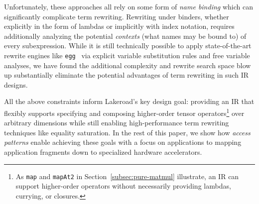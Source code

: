 \documentclass[prologue, dvipsnames, sigplan, screen, review, anonymous]{acmart}
\newcommand{\g}{Lakeroad\xspace}
\newcommand{\tcd}[1]{\texttt{#1}}
\newcommand{\mcd}[1]{\mathrm{\tcd{#1}}}
\begin{document}
Unfortunately, these approaches all rely on some
  form of \textit{name binding} which can
  significantly complicate term rewriting.
Rewriting under binders,
  whether explicitly in the form of lambdas
  or implicitly with index notation,
  requires additionally analyzing the
  potential \textit{contexts}
  (what names may be bound to)
  of every subexpression.
While it is still technically possible to
  apply state-of-the-art rewrite engines
  like \tcd{egg}~\cite{willsey2021egg}
  via explicit variable substitution rules and
  free variable analyses,
  we have found the additional complexity
  and rewrite search space blow up
  substantially eliminate the potential advantages
  of term rewriting in such IR designs.

All the above constraints inform \g's key design goal:
  providing an IR that flexibly supports specifying and
  composing higher-order tensor operators\footnote{
    As \tcd{map} and \tcd{mapAt2} in 
    Section~\ref{subsec:pure-matmul} illustrate,
    an IR can support higher-order operators without
    necessarily providing lambdas, currying, or closures.}
  over arbitrary dimensions while still enabling
  high-performance term rewriting techniques
  like equality saturation.
In the rest of this paper,
  we show how \textit{access patterns} enable achieving
  these goals with a focus on applications to
  mapping application fragments down to
  specialized hardware accelerators.


  







\end{document}
